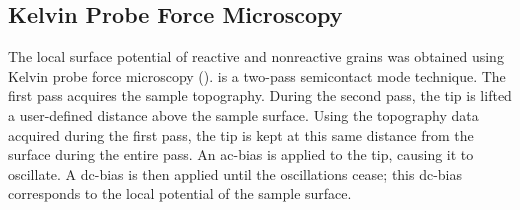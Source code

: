 \subsection{Kelvin Probe Force Microscopy}
\label{subsec:ch9kfm}


The local surface potential of reactive and nonreactive grains was obtained using Kelvin
probe force microscopy ().  is a two-pass semicontact mode technique.
The first pass acquires the sample topography. During the second pass, the tip is lifted a
user-defined distance above the sample surface. Using the topography data acquired during
the first pass, the tip is kept at this same distance from the surface during the entire
pass. An ac-bias is applied to the tip, causing it to oscillate. A dc-bias is then applied
until the oscillations cease; this dc-bias corresponds to the local potential of the
sample surface.

